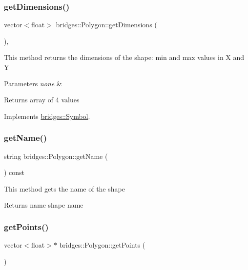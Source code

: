 \subsubsection{\texorpdfstring{get\+Dimensions()}{getDimensions()}}
{\footnotesize\ttfamily vector$<$float$>$ bridges\+::\+Polygon\+::get\+Dimensions (\begin{DoxyParamCaption}{ }\end{DoxyParamCaption})\hspace{0.3cm}{\ttfamily [inline]}, {\ttfamily [virtual]}}

This method returns the dimensions of the shape\+: min and max values in X and Y


\begin{DoxyParams}{Parameters}
{\em none} & \\
\hline
\end{DoxyParams}
\begin{DoxyReturn}{Returns}
array of 4 values 
\end{DoxyReturn}


Implements \mbox{\hyperlink{classbridges_1_1_symbol_a6eb190dc71b31b344b7610a07c6dc1d5}{bridges\+::\+Symbol}}.

\mbox{\label{classbridges_1_1_polygon_af376b1e7ab19ae90e7de9ba1f717753b}} 
\subsubsection{\texorpdfstring{get\+Name()}{getName()}}
{\footnotesize\ttfamily string bridges\+::\+Polygon\+::get\+Name (\begin{DoxyParamCaption}{ }\end{DoxyParamCaption}) const\hspace{0.3cm}{\ttfamily [inline]}}

This method gets the name of the shape

\begin{DoxyReturn}{Returns}
name shape name 
\end{DoxyReturn}
\mbox{\label{classbridges_1_1_polygon_aa4006759697d4428074747686cf231f9}} 
\subsubsection{\texorpdfstring{get\+Points()}{getPoints()}}
{\footnotesize\ttfamily vector$<$float$>$$\ast$ bridges\+::\+Polygon\+::get\+Points (\begin{DoxyParamCaption}{ }\end{DoxyParamCaption})\hspace{0.3cm}{\ttfamily [inline]}}


